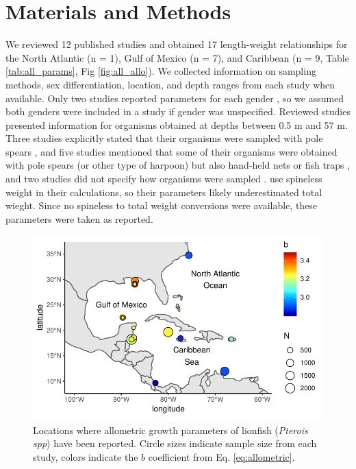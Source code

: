 \documentclass[smallextended]{svjour3}       %
\begin{document}
\section{Materials and Methods}\label{materials-and-methods}

We reviewed 12 published studies and obtained 17 length-weight
relationships for the North Atlantic (n = 1), Gulf of Mexico (n = 7),
and Caribbean (n = 9, Table \ref{tab:all_params}, Fig
\ref{fig:all_allo}). We collected information on sampling methods, sex
differentiation, location, and depth ranges from each study when
available. Only two studies reported parameters for each gender
\citep{aguilarperera_2016,fogg_2013}, so we assumed both genders were
included in a study if gender was unspecified. Reviewed studies
presented information for organisms obtained at depths between 0.5 m and
57 m. Three studies explicitly stated that their organisms were sampled
with pole spears
\citep{dahl_2014,aguilarperera_2016,chin_2016,sabidoitz_2016}, and five
studies mentioned that some of their organisms were obtained with pole
spears (or other type of harpoon) but also hand-held nets or fish traps
\citep{barbour_2011,fogg_2013,edwards_2014,toledohernndez_2014,sandel_2015,sabidoitza_2016,sabidoitz_2016},
and two studies did not specify how organisms were sampled
\citep{darling_2011,deleon_2013}. \citet{fogg_2013} use spineless weight
in their calculations, so their parameters likely underestimated total
wieght. Since no spineless to total weight conversions were available,
these parameters were taken as reported.

\begin{figure}
\centering
\includegraphics{Manuscript_files/figure-latex/unnamed-chunk-2-1.pdf}
\caption{\label{fig:map}Locations where allometric growth parameters of
lionfish (\emph{Pterois spp}) have been reported. Circle sizes indicate
sample size from each study, colors indicate the \(b\) coefficient from
Eq. \ref{eq:allometric}.}
\end{figure}
\end{document}
